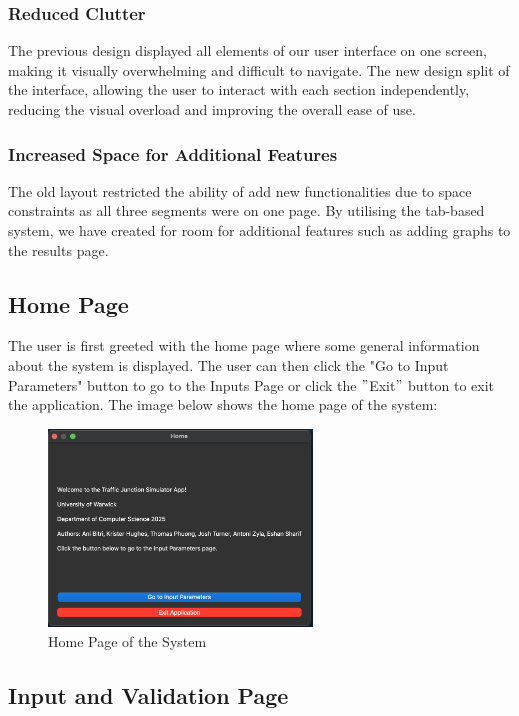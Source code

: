 \documentclass{article}
\begin{document}
    \subsubsection{Reduced Clutter}
    The previous design displayed all elements of our user interface on one screen, making it visually overwhelming and difficult to navigate. The new design split of
    the interface, allowing the user to interact with each section independently, reducing the visual overload and improving the overall ease of use.

    \subsubsection{Increased Space for Additional Features}
    The old layout restricted the ability of add new functionalities due to space constraints as all three segments were on one page. By utilising the tab-based system,
    we have created for room for additional features such as adding graphs to the results page.

    \subsection{Home Page}

    The user is first greeted with the home page where some general information about the system is displayed. The user can then click the "Go to Input Parameters" button to go to the Inputs Page
    or click the \("\)Exit\("\) button to exit the application.
    The image below shows the home page of the system:

    \begin{figure}[H]
        \centering
        \includegraphics[width=7cm]{homepage.png}
        \caption{Home Page of the System}
        \label{fig:homepage}
    \end{figure}

    \subsection{Input and Validation Page}
\end{document}
